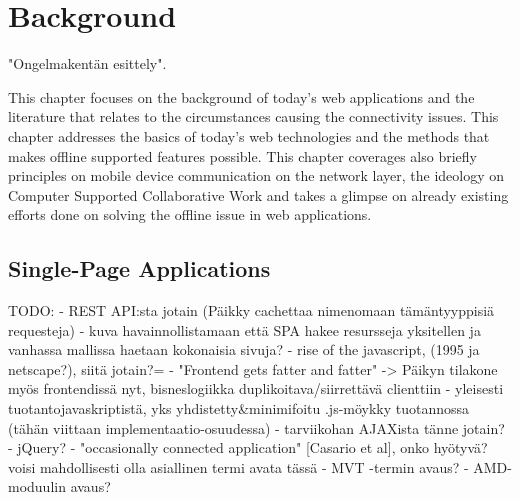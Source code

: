 
\chapter{Background}

"Ongelmakentän esittely".

This chapter focuses on the background of today's web applications and the literature that relates to the circumstances causing the connectivity issues. This chapter addresses the basics of today's web technologies and the methods that makes offline supported features possible. This chapter coverages also briefly principles on mobile device communication on the network layer, the ideology on Computer Supported Collaborative Work and takes a glimpse on already existing efforts done on solving the offline issue in web applications.



\section{Single-Page Applications}
TODO: %
- REST API:sta jotain (Päikky cachettaa nimenomaan tämäntyyppisiä requesteja)
- kuva havainnollistamaan että SPA hakee resursseja yksitellen ja vanhassa mallissa haetaan kokonaisia sivuja?
- rise of the javascript, (1995 ja netscape?), siitä jotain?=
- "Frontend gets fatter and fatter" -> Päikyn tilakone myös frontendissä nyt, bisneslogiikka duplikoitava/siirrettävä clienttiin
- yleisesti tuotantojavaskriptistä, yks yhdistetty&minimifoitu .js-möykky tuotannossa (tähän viittaan implementaatio-osuudessa)
- tarviikohan AJAXista tänne jotain?
- jQuery?
- "occasionally connected application" [Casario et al], onko hyötyvä? voisi mahdollisesti olla asiallinen termi avata tässä
- MVT -termin avaus?
- AMD-moduulin avaus?


